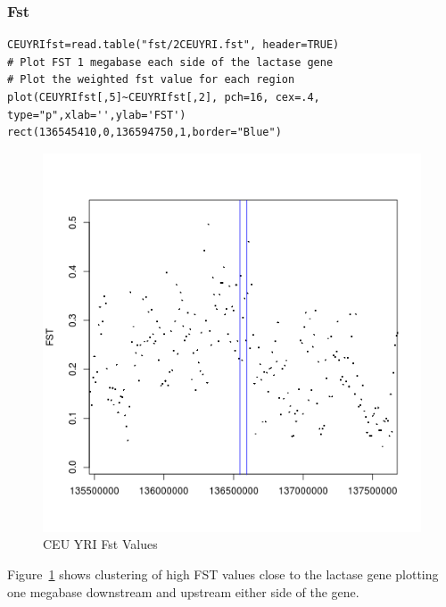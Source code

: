 \documentclass[a4paper,10pt]{article}
\begin{document}
\subsubsection{Fst}


\begin{verbatim}
CEUYRIfst=read.table("fst/2CEUYRI.fst", header=TRUE)
# Plot FST 1 megabase each side of the lactase gene
# Plot the weighted fst value for each region
plot(CEUYRIfst[,5]~CEUYRIfst[,2], pch=16, cex=.4, type="p",xlab='',ylab='FST') 
rect(136545410,0,136594750,1,border="Blue") 
\end{verbatim}

\begin{figure}
\centering
\includegraphics{pictures/CEUYRI2.png}
\caption{CEU YRI Fst Values}
\label{fig:a}
\end{figure}
Figure~\ref{fig:a} shows clustering of high FST values close to the lactase gene plotting one megabase downstream and upstream either side of the gene. 
\end{document}

